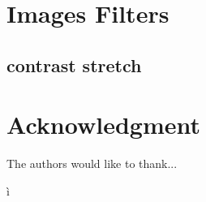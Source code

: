 \documentclass[conference]{IEEEtran}
\begin{document}
%


\appendices
\section{Images Filters}
\subsection{contrast stretch}

\section*{Acknowledgment}


The authors would like to thank...


\ifCLASSOPTIONcaptionsoff
  \newpage
\fi



 ì%

\end{document}
